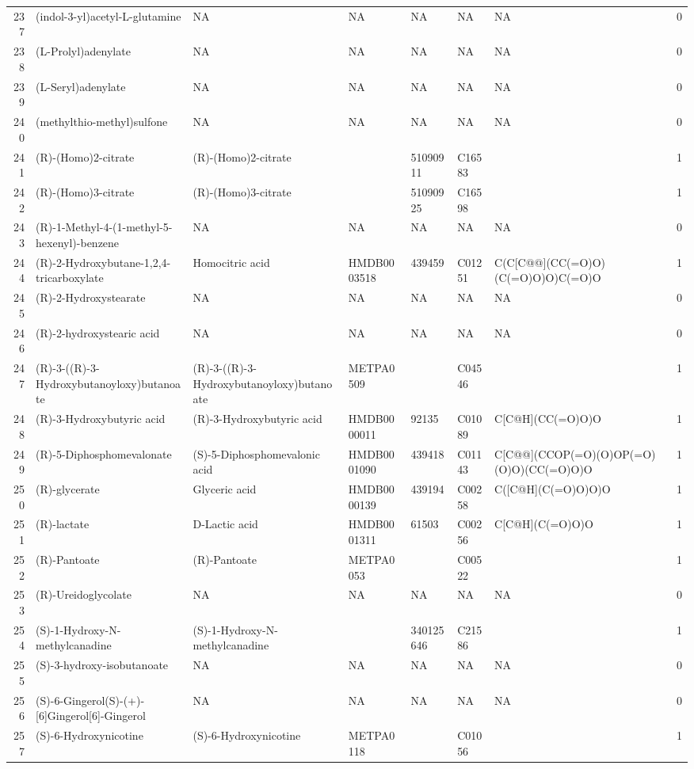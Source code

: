 \documentclass[a4paper]{article}
\begin{document}
\begin{longtable}{rlllllll}
  237 & (indol-3-yl)acetyl-L-glutamine & NA & NA & NA & NA & NA & 0 \\ 
  238 & (L-Prolyl)adenylate & NA & NA & NA & NA & NA & 0 \\ 
  239 & (L-Seryl)adenylate & NA & NA & NA & NA & NA & 0 \\ 
  240 & (methylthio-methyl)sulfone & NA & NA & NA & NA & NA & 0 \\ 
  241 & (R)-(Homo)2-citrate & (R)-(Homo)2-citrate &  & 51090911 & C16583 &  & 1 \\ 
  242 & (R)-(Homo)3-citrate & (R)-(Homo)3-citrate &  & 51090925 & C16598 &  & 1 \\ 
  243 & (R)-1-Methyl-4-(1-methyl-5-hexenyl)-benzene & NA & NA & NA & NA & NA & 0 \\ 
  244 & (R)-2-Hydroxybutane-1,2,4-tricarboxylate & Homocitric acid & HMDB0003518 & 439459 & C01251 & C(C[C@@](CC(=O)O)(C(=O)O)O)C(=O)O & 1 \\ 
  245 & (R)-2-Hydroxystearate & NA & NA & NA & NA & NA & 0 \\ 
  246 & (R)-2-hydroxystearic acid & NA & NA & NA & NA & NA & 0 \\ 
  247 & (R)-3-((R)-3-Hydroxybutanoyloxy)butanoate & (R)-3-((R)-3-Hydroxybutanoyloxy)butanoate & METPA0509 &  & C04546 &  & 1 \\ 
  248 & (R)-3-Hydroxybutyric acid & (R)-3-Hydroxybutyric acid & HMDB0000011 & 92135 & C01089 & C[C@H](CC(=O)O)O & 1 \\ 
  249 & (R)-5-Diphosphomevalonate & (S)-5-Diphosphomevalonic acid & HMDB0001090 & 439418 & C01143 & C[C@@](CCOP(=O)(O)OP(=O)(O)O)(CC(=O)O)O & 1 \\ 
  250 & (R)-glycerate & Glyceric acid & HMDB0000139 & 439194 & C00258 & C([C@H](C(=O)O)O)O & 1 \\ 
  251 & (R)-lactate & D-Lactic acid & HMDB0001311 & 61503 & C00256 & C[C@H](C(=O)O)O & 1 \\ 
  252 & (R)-Pantoate & (R)-Pantoate & METPA0053 &  & C00522 &  & 1 \\ 
  253 & (R)-Ureidoglycolate & NA & NA & NA & NA & NA & 0 \\ 
  254 & (S)-1-Hydroxy-N-methylcanadine & (S)-1-Hydroxy-N-methylcanadine &  & 340125646 & C21586 &  & 1 \\ 
  255 & (S)-3-hydroxy-isobutanoate & NA & NA & NA & NA & NA & 0 \\ 
  256 & (S)-6-Gingerol(S)-(+)-[6]Gingerol[6]-Gingerol & NA & NA & NA & NA & NA & 0 \\ 
  257 & (S)-6-Hydroxynicotine & (S)-6-Hydroxynicotine & METPA0118 &  & C01056 &  & 1 \\ 

\end{longtable}
\end{document}
